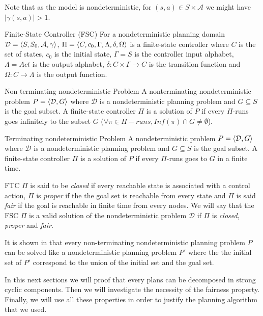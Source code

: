 Note that as the model is nondeterministic, for $(s,a) \in S \times \mathcal{A}$ we might have $|\gamma(s,a)|>1$.

\begin{nameddef}{Finite-State Controller (FSC)}
For a nondeterministic planning domain
$\mathcal{D} = \planningdomain$,
$\Pi = \controller$ is a finite-state controller where
$C$ is the set of states,
$c_0$ is the initial state,
$\Gamma = S$ is the controller input alphabet,
$\Lambda = Act$ is the output alphabet,
$\delta: C \times \Gamma \rightarrow C$ is the transition function and 
$\Omega: C \rightarrow \Lambda$ is the output function.
\end{nameddef}

\begin{nameddef}{Non terminating nondeterministic Problem}
A nonterminating nondeterministic problem $P = \planningproblem$ where $\mathcal{D}$ is a nondeterministic planning problem and $G \subseteq S$ is the goal subset. A finite-state controller $\Pi$ is a solution of $P$ if every $\Pi$-runs goes infinitely to the subset $G$ ($\forall \pi \in \Pi-runs, Inf(\pi) \cap G \neq \emptyset$).
\end{nameddef}

\begin{nameddef}{Terminating nondeterministic Problem}
A nondeterministic problem $P = \planningproblem$ where $\mathcal{D}$ is a nondeterministic planning problem and $G \subseteq S$ is the goal subset. A finite-state controller $\Pi$ is a solution of $P$ if every $\Pi$-runs goes to $G$ in a finite time.
\end{nameddef}

FTC $\Pi$ is said to be \textit{closed} if every reachable state is associated with a control  action, $\Pi$ is \textit{proper} if the the goal set is reachable from every state and $\Pi$ is said \textit{fair} if the goal is reachable in finite time from every nodes.
We will say that the FSC $\Pi$ is a valid solution of the nondeterministic problem $\mathcal{D}$ if $\Pi$ is \textit{closed}, \textit{proper} and \textit{fair}.

It is shown in \cite{patrizi2013fair} that every non-terminating nondeterministic planning problem $P$ can be solved like a nondeterministic planning problem $P'$ where the the initial set of $P'$ correspond to the union of the initial set and the goal set.

In this next sections we will proof that every plans can be decomposed in strong cyclic components.
Then we will investigate the necessity of the fairness property.
Finally, we will use all these properties in order to justify the planning algorithm that we used.

